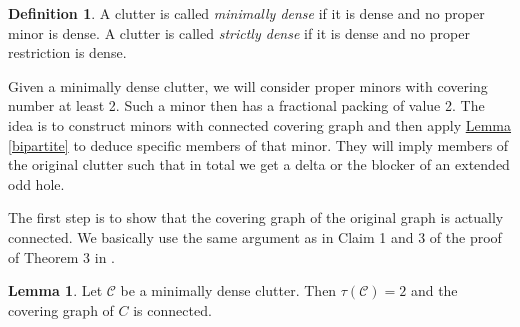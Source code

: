 \documentclass[a4paper, 12pt]{scrbook}
\theoremstyle{definition}
\newtheorem*{definition}{Definition}
\newtheorem{lemma}[theorem]{Lemma}
\begin{document}
   \begin{definition}
       A clutter is called \emph{minimally dense} if it is dense and no proper minor is dense.
       A clutter is called \emph{strictly dense} if it is dense and no proper restriction is dense.
   \end{definition}

   Given a minimally dense clutter, we will consider proper minors with covering number at least 2.
   Such a minor then has a fractional packing of value 2.
   The idea is to construct minors with connected covering graph and then apply \hyperref[bipartite]{Lemma \ref*{bipartite}} to deduce specific members of that minor.
   They will imply members of the original clutter such that in total we get a delta or the blocker of an extended odd hole.

   The first step is to show that the covering graph of the original graph is actually connected.
   We basically use the same argument as in Claim 1 and 3 of the proof of Theorem 3 in \cite{deltas}.

   \begin{lemma}\label{connectivity}
       Let $\mathcal{C}$ be a minimally dense clutter.
       Then $\tau(\mathcal{C})=2$ and the covering graph of $C$ is connected.
   \end{lemma}
\end{document}
